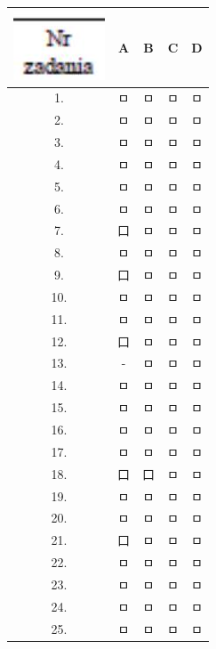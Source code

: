 \documentclass[10pt]{article}
\begin{document}
\begin{center}
\begin{tabular}{|c|c|c|c|c|}
\hline
\includegraphics[max width=\textwidth]{2024_11_21_90ea54b753259b37713ag-16}
 & A & B & C & D \\
\hline
1. & ㅁ & ㅁ & ㅁ & ㅁ \\
\hline
2. & ㅁ & ㅁ & ㅁ & ㅁ \\
\hline
3. & ㅁ & ㅁ & ㅁ & ㅁ \\
\hline
4. & ㅁ & ㅁ & ㅁ & ㅁ \\
\hline
5. & ㅁ & ㅁ & ㅁ & ㅁ \\
\hline
6. & ㅁ & ㅁ & ㅁ & ㅁ \\
\hline
7. & 口 & ㅁ & ㅁ & ㅁ \\
\hline
8. & ㅁ & ㅁ & ㅁ & ㅁ \\
\hline
9. & 口 & ㅁ & ㅁ & ㅁ \\
\hline
10. & ㅁ & ㅁ & ㅁ & ㅁ \\
\hline
11. & ㅁ & ㅁ & ㅁ & ㅁ \\
\hline
12. & 口 & ㅁ & ㅁ & ㅁ \\
\hline
13. & - & ㅁ & ㅁ & ㅁ \\
\hline
14. & ㅁ & ㅁ & ㅁ & ㅁ \\
\hline
15. & ㅁ & ㅁ & ㅁ & ㅁ \\
\hline
16. & ㅁ & ㅁ & ㅁ & ㅁ \\
\hline
17. & ㅁ & ㅁ & ㅁ & ㅁ \\
\hline
18. & 口 & 口 & ㅁ & ㅁ \\
\hline
19. & ㅁ & ㅁ & ㅁ & ㅁ \\
\hline
20. & ㅁ & ㅁ & ㅁ & ㅁ \\
\hline
21. & 口 & ㅁ & ㅁ & ㅁ \\
\hline
22. & ㅁ & ㅁ & ㅁ & ㅁ \\
\hline
23. & ㅁ & ㅁ & ㅁ & ㅁ \\
\hline
24. & ㅁ & ㅁ & ㅁ & ㅁ \\
\hline
25. & ㅁ & ㅁ & ㅁ & ㅁ \\
\hline
\end{tabular}
\end{center}
\end{document}
